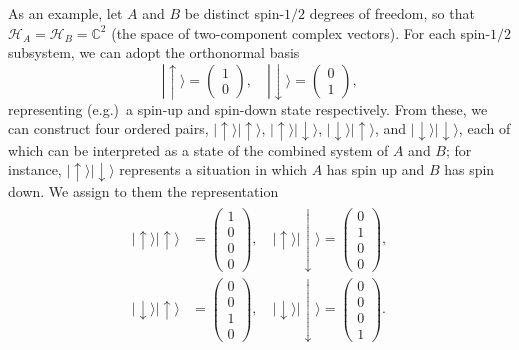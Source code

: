 \documentclass[pra,12pt]{revtex4-2}
\begin{document}
As an example, let $A$ and $B$ be distinct spin-$1/2$ degrees of
freedom, so that $\mathscr{H}_A = \mathscr{H}_B = \mathbb{C}^2$ (the
space of two-component complex vectors).  For each spin-$1/2$
subsystem, we can adopt the orthonormal basis
\begin{equation}
  |\!\uparrow\rangle = \begin{pmatrix}1 \\ 0 \end{pmatrix}, \quad
  |\!\downarrow\rangle = \begin{pmatrix}0 \\ 1 \end{pmatrix},
\end{equation}
representing (e.g.)~a spin-up and spin-down state respectively.  From
these, we can construct four ordered pairs, $|\!\uparrow\rangle
|\!\uparrow\rangle$, $|\!\uparrow\rangle |\!\downarrow\rangle$,
$|\!\downarrow\rangle |\!\uparrow\rangle$, and $|\!\downarrow\rangle
|\!\downarrow\rangle$, each of which can be interpreted as a state of
the combined system of $A$ and $B$; for instance, $|\!\uparrow\rangle
|\!\downarrow\rangle$ represents a situation in which $A$ has spin up
and $B$ has spin down.  We assign to them the representation
\begin{align}
  \begin{aligned}
  |\!\uparrow\rangle  |\!\uparrow\rangle
  &= \begin{pmatrix}1 \\ 0 \\ 0 \\ 0\end{pmatrix},\quad
  |\!\uparrow\rangle  |\!\downarrow\rangle
  = \begin{pmatrix}0 \\ 1 \\ 0 \\ 0\end{pmatrix}, \\
  |\!\downarrow\rangle  |\!\uparrow\rangle
  &= \begin{pmatrix}0 \\ 0 \\ 1 \\ 0\end{pmatrix},\quad
  |\!\downarrow\rangle  |\!\downarrow\rangle
  = \begin{pmatrix}0 \\ 0 \\ 0 \\ 1\end{pmatrix}.
  \end{aligned}
  \label{c4basis}
\end{align}
\end{document}
